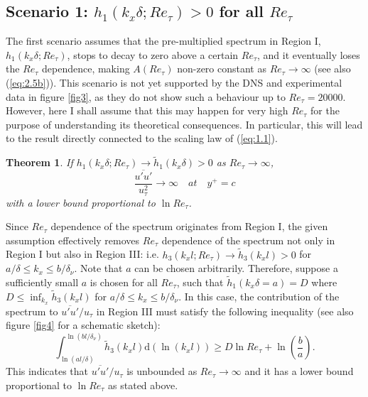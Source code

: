 \documentclass{jfm}
\newtheorem{theorem}{Theorem}
\begin{document}
\subsection{Scenario 1: $h_1(k_x \delta;Re_\tau)>0$ for all $Re_\tau$}\label{sec:3.1}
The first scenario assumes that the pre-multiplied spectrum in Region I, $h_1(k_x \delta; Re_\tau)$, stops to decay to zero above a certain $Re_\tau$, and it eventually loses the $Re_\tau$ dependence, making $A(Re_\tau)$ non-zero constant as $Re_\tau \rightarrow \infty$ (see also (\ref{eq:2.5b})). This scenario is not yet supported by the DNS and experimental data in figure \ref{fig3}, as they do not show such a behaviour up to $Re_\tau = 20000$. However, here I shall assume that this may happen for very high $Re_\tau$ for the purpose of understanding its theoretical consequences. In particular, this will lead to the result directly connected to the scaling law of (\ref{eq:1.1}).

\begin{theorem}\label{st:1}
\textit{If $h_1(k_x \delta; Re_\tau) \rightarrow \tilde{h}_1(k_x \delta)>0$ as $Re_\tau \rightarrow \infty$,
\begin{equation}
\frac{\overline{u'u'}}{u_\tau^2} \rightarrow \infty\quad at \quad y^+=c
\end{equation}
with a lower bound proportional to $\ln Re_\tau$.}
\end{theorem}
Since $Re_\tau$ dependence of the spectrum originates from Region I, the given assumption effectively removes $Re_\tau$ dependence of the spectrum not only in Region I but also in Region III: i.e. $h_3(k_x l; Re_\tau) \rightarrow \tilde{h}_3(k_x l)>0$ for $a/\delta \leq k_x \leq b/\delta_\nu$. Note that $a$ can be chosen arbitrarily. Therefore, suppose a sufficiently small $a$ is chosen for all $Re_\tau$, such that $\tilde{h}_1(k_x \delta=a) = D$ where $D \leq \inf_{k_x} \tilde{h}_3(k_x l)$ for $a/\delta \leq k_x \leq b/\delta_\nu$. In this case, the contribution of the spectrum to $\overline{u'u'}/u_\tau$ in Region III must satisfy the following inequality (see also figure \ref{fig4} for a schematic sketch):
\begin{equation}\label{eq:3.1}
\int_{\ln (al/\delta)}^{\ln (bl/\delta_\nu)} \tilde{h}_3(k_x l) \mathrm{d}(\ln (k_x l)) \geq D \ln Re_\tau +\ln \left(\frac{b}{a}\right).
\end{equation}
This indicates that $\overline{u'u'}/u_\tau$ is unbounded as $Re_\tau \rightarrow \infty$ and it has a lower bound proportional to $\ln Re_\tau$ as stated above.
\end{document}
